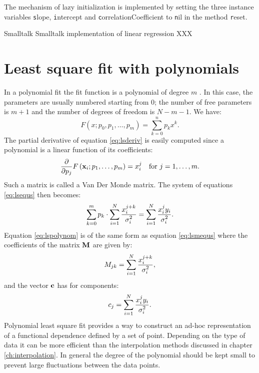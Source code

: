The mechanism of lazy initialization is implemented by setting the
three instance variables {\texttt slope}, {\texttt intercept} and {\texttt
correlationCoefficient} to {\texttt nil} in the method {\texttt reset}.

\begin{listing}[label=ls:linreg]{Smalltalk}
  {Smalltalk implementation of linear regression}
XXX
\end{listing}

\section{Least square fit with polynomials}
\label{sec:lsfpol} In a polynomial fit the fit function is a
polynomial of degree $m$ . In this case, the parameters are
usually numbered starting from 0; the number of free parameters is
$m+1$ and the number of degrees of freedom is $N-m-1$. We have:
\begin{equation}
F\left(x;p_0,p_1,\ldots,p_m\right)=\sum_{k=0}^n p_k x^k.
\end{equation}
The partial derivative of equation \ref{eq:lsderiv} is easily
computed since a polynomial is a linear function of its
coefficients:
\begin{equation}
  {\displaystyle \partial\over\displaystyle\partial p_j}
  F\left({\textbf x}_i;p_1,\ldots,p_m\right)=x_i^j\mbox{\quad for
  $j=1,\ldots,m$}.
\end{equation}
Such a matrix is called a Van Der Monde matrix. The system of
equations \ref{eq:lsequs} then becomes:
\begin{equation}
\label{eq:lspolynom}
 \sum_{k=0}^m p_k\cdot\sum_{i=1}^N{\displaystyle
x_i^{j+k}\over\displaystyle\sigma_i^2} =\sum_{i=1}^N{\displaystyle
x_i^j y_i\over\displaystyle\sigma_i^2}.
\end{equation}
Equation \ref{eq:lspolynom} is of the same form as equation
\ref{eq:lsmequs} where the coefficients of the matrix ${\textbf M}$
are given by:
\begin{equation}
M_{jk}=\sum_{i=1}^N {\displaystyle
x_i^{j+k}\over\displaystyle\sigma_i^2},
\end{equation}
and the vector ${\textbf c}$ has for components:
\begin{equation}
c_j =\sum_{i=1}^N{\displaystyle x_i^j
y_i\over\displaystyle\sigma_i^2}.
\end{equation}
Polynomial least square fit provides a way to construct an ad-hoc
representation of a functional dependence defined by a set of
point. Depending on the type of data it can be more efficient than
the interpolation methods discussed in chapter
\ref{ch:interpolation}. In general the degree of the polynomial
should be kept small to prevent large fluctuations between the
data points.

